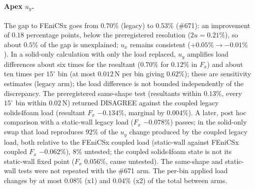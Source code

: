 \documentclass[sn-mathphys,Numbered]{sn-jnl}
\begin{document}
\paragraph{Apex $u_y$.}
The gap to FEniCSx goes from $0.70\%$ (legacy) to $0.53\%$ (\#671): an improvement of $0.18$ percentage points, below the preregistered resolution ($2u=0.21\%$), so about $0.5\%$ of the gap is unexplained; $u_x$ remains consistent ($+0.05\%\to-0.01\%$).
In a solid-only calculation with only the load replaced, $u_y$ amplifies load differences about six times for the resultant ($0.70\%$ for $0.12\%$ in $F_x$) and about ten times per $15^\circ$ bin (at most $0.012\,\mathrm{N}$ per bin giving $0.62\%$); these are sensitivity estimates (legacy arm); the load difference is not bounded independently of the discrepancy.
The preregistered same-shape test (resultants within $0.13\%$, every $15^\circ$ bin within $0.02\,\mathrm{N}$) returned DISAGREE against the coupled legacy solids4foam load (resultant $F_x$ $-0.134\%$, marginal by $0.004\%$).
A later, post hoc comparison with a static-wall legacy load ($F_x$ $-0.078\%$) passes; in the solid-only swap that load reproduces $92\%$ of the $u_y$ change produced by the coupled legacy load, both relative to the FEniCSx coupled load (static-wall against FEniCSx coupled $F_x$ $-0.062\%$), $8\%$ untested; the coupled solids4foam state is not its static-wall fixed point ($F_x$ $0.056\%$, cause untested).
The same-shape and static-wall tests were not repeated with the \#671 arm.
The per-bin applied load changes by at most $0.08\%$ (x1) and $0.04\%$ (x2) of the total between arms.
\end{document}
